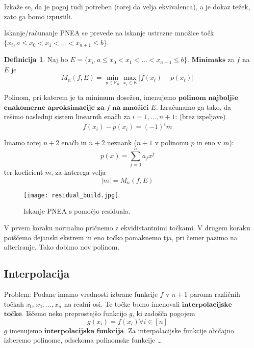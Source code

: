 \documentclass[a4paper,12pt]{article}
\theoremstyle{definition}
\newtheorem{defn}[counter]{Definicija}
\theoremstyle{remark}
\newcommand{\Pp}{\mathbb{P}}
\begin{document}
Izkaže se, da je pogoj tudi potreben (torej da velja ekvivalenca), a je dokaz težek, zato ga bomo izpustili.

Iskanje/računanje PNEA se prevede na iskanje ustrezne množice točk $\{x_i, a \leq x_0 < x_1 < \dots < x_{n+1} \leq b\}$.

\begin{defn}
    Naj bo $E = \{x_i, a \leq x_0 < x_1 < \dots < x_{n+1} \leq b\}$. $\textbf{Minimaks}$ za $f$ na $E$ je
    \begin{equation*}
        M_n (f, E) = \min_{p \in \Pp_n} \max_{x_i \in E} \left| f(x_i) - p(x_i) \right|
    \end{equation*}
\end{defn}

Polinom, pri katerem je ta minimum dosežen, imenujemo $\textbf{polinom}$ $\textbf{najboljše}$ $\textbf{enakomerne}$ $\textbf{aproksimacije}$ $\textbf{za}$ $f$
$\textbf{na}$ $\textbf{množici}$ $E$. Izračunamo ga tako, da rešimo naslednji sistem linearnih enačb za $i = 1, \dots, n+1$: (brez izpeljave)
\begin{equation*}
    f(x_i) - p(x_i) = (-1)^i m
\end{equation*}

Imamo torej $n+2$ enačb in $n+2$ neznank ($n + 1$ v polinomu $p$ in eno v $m$):
\begin{equation*}
    p(x) = \sum_{j = 0}^{n} a_j x^j
\end{equation*}
ter koeficient $m$, za katerega velja
\begin{equation*}
    \left| m \right| = M_n (f, E)
\end{equation*}

\begin{figure}[H]
    \center
    \texttt{[image: residual\_build.jpg]}
    \caption{Iskanje PNEA s pomočjo residuala.}
\end{figure}

V prvem koraku normalno pričnemo z ekvidistantnimi točkami. V drugem koraku poiščemo dejanski ekstrem in eno točko pomaknemo tja, pri čemer pazimo na alteriranje. Tako dobimo nov polinom.


\subsection{Interpolacija}
Problem: Podane imamo vrednosti izbrane funkcije $f$ v $n+1$ paroma različnih točkah $x_0, x_1, \dots, x_n$ na realni osi. Te točke bomo imenovali
$\textbf{interpolacijske}$ $\textbf{točke}$. Iščemo neko preprostejšo funkcijo $g$, ki zadošča pogojem
\begin{equation*}
    g(x_i) = f(x_i) \forall i \in [n]
\end{equation*}
$g$ imenujemo $\textbf{interpolacijska}$ $\textbf{funkcija}$. Za interpolacijske funkcije običajno izberemo polinome, odsekoma polinomske funkcije \dots
\end{document}
